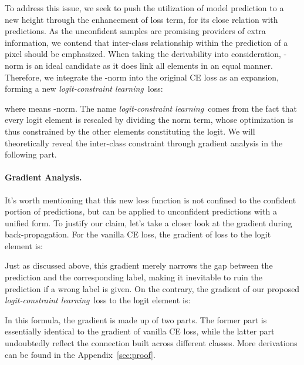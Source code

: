 \documentclass[letterpaper]{article} \usepackage{aaai23}  \usepackage{times}  \usepackage{helvet}  \usepackage{courier}  \usepackage[hyphens]{url}  \usepackage{graphicx} \urlstyle{rm} \def\UrlFont{\rm}  \usepackage{natbib}  \usepackage{caption} \frenchspacing  \setlength{\pdfpagewidth}{8.5in}  \setlength{\pdfpageheight}{11in}  \usepackage{algorithm}
\newcommand{\lossModuleName}{\textit{logit-constraint learning}}
\begin{document}
To address this issue, we seek to push the utilization of model prediction to a new height through the enhancement of loss term, for its close relation with predictions. As the unconfident samples are promising providers of extra information, we contend that inter-class relationship within the prediction of a pixel should be emphasized. When taking the derivability into consideration, -norm is an ideal candidate as it does link all elements in an equal manner. Therefore, we integrate the -norm into the original CE loss as an expansion, forming a new \lossModuleName~loss:
\begin{small}
    
\end{small}where  means -norm. The name \lossModuleName~comes from the fact that every logit element is rescaled by dividing the norm term, whose optimization is thus constrained by the other elements constituting the logit. We will theoretically reveal the inter-class constraint through gradient analysis in the following part.

\paragraph{Gradient Analysis.} It's worth mentioning that this new loss function is not confined to the confident portion of predictions, but can be applied to unconfident predictions with a unified form. To justify our claim, let's take a closer look at the gradient during back-propagation. For the vanilla CE loss, the gradient of loss to the  logit element is:
\begin{small}
    
\end{small}Just as discussed above, this gradient merely narrows the gap between the prediction and the corresponding label, making it inevitable to ruin the prediction if a wrong label is given. On the contrary, the gradient of our proposed \lossModuleName~loss to the  logit element is:
\begin{small}
    
\end{small}In this formula, the gradient is made up of two parts. The former part is essentially identical to the gradient of vanilla CE loss, while the latter part undoubtedly reflect the connection built across different classes. More derivations can be found in the Appendix~\ref{sec:proof}.
\end{document}
